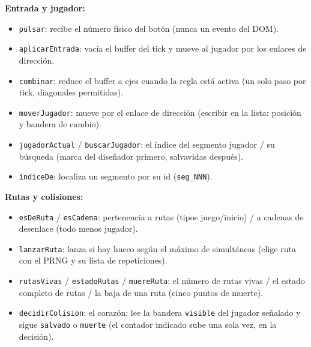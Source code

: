 \documentclass[../main.tex]{subfiles}
\begin{document}
	\textbf{Entrada y jugador:}
	\begin{itemize}
		\item \texttt{pulsar}: recibe el número físico del botón (nunca un
		evento del DOM).
		\item \texttt{aplicarEntrada}: vacía el buffer del tick y mueve al
		jugador por los enlaces de dirección.
		\item \texttt{combinar}: reduce el buffer a ejes cuando la regla
		está activa (un solo paso por tick, diagonales permitidas).
		\item \texttt{moverJugador}: mueve por el enlace de dirección
		(escribir en la lista: posición y bandera de cambio).
		\item \texttt{jugadorActual} / \texttt{buscarJugador}: el índice del
		segmento jugador / su búsqueda (marca del diseñador primero,
		salvavidas después).
		\item \texttt{indiceDe}: localiza un segmento por su id
		(\texttt{seg\_NNN}).
	\end{itemize}
	
	\textbf{Rutas y colisiones:}
	\begin{itemize}
		\item \texttt{esDeRuta} / \texttt{esCadena}: pertenencia a rutas
		(tipos juego/inicio) / a cadenas de desenlace (todo menos jugador).
		\item \texttt{lanzarRuta}: lanza si hay hueco según el máximo de
		simultáneas (elige ruta con el PRNG y su lista de repeticiones).
		\item \texttt{rutasVivas} / \texttt{estadoRutas} / \texttt{muereRuta}:
		el número de rutas vivas / el estado completo de rutas / la baja de
		una ruta (cinco puntos de muerte).
		\item \texttt{decidirColision}: el corazón: lee la bandera
		\texttt{visible} del jugador señalado y sigue \texttt{salvado} o
		\texttt{muerte} (el contador indicado sube una sola vez, en la
		decisión).
	\end{itemize}
	
\end{document}
